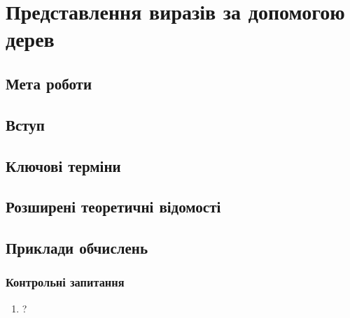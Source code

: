 \chapter{Представлення виразів за допомогою дерев}
\nopagebreak[4]
\section*{Мета роботи}

\nopagebreak[4]
\section{Вступ}
\nopagebreak[4]


\section{Ключові терміни}
\nopagebreak[4]




\section{Розширені теоретичні відомості}
\nopagebreak[4]




\section{Приклади обчислень}
\nopagebreak[4]




\subsection*{Контрольні запитання}
\nopagebreak[4]
\begin{enumerate}
\item ?
\end{enumerate}